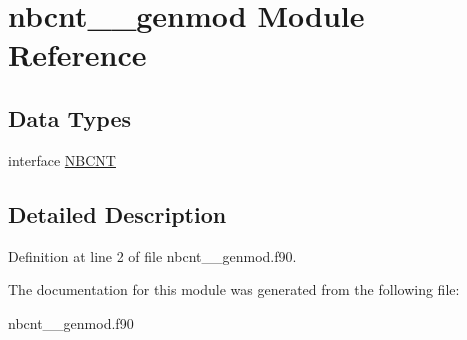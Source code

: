 \hypertarget{classnbcnt____genmod}{\section{nbcnt\+\_\+\+\_\+genmod Module Reference}
\label{classnbcnt____genmod}
}
\subsection*{Data Types}
\begin{DoxyCompactItemize}
\item 
interface \hyperlink{interfacenbcnt____genmod_1_1_n_b_c_n_t}{N\+B\+C\+N\+T}
\end{DoxyCompactItemize}


\subsection{Detailed Description}


Definition at line 2 of file nbcnt\+\_\+\+\_\+genmod.\+f90.



The documentation for this module was generated from the following file\+:\begin{DoxyCompactItemize}
\item 
nbcnt\+\_\+\+\_\+genmod.\+f90\end{DoxyCompactItemize}
